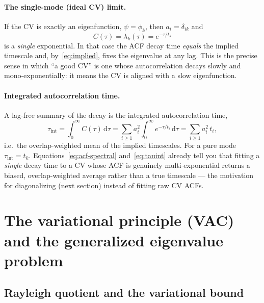 \documentclass[11pt]{article}
\theoremstyle{plain}
\theoremstyle{definition}
\newcommand{\dd}{\,\mathrm{d}}
\begin{document}
\paragraph{The single-mode (ideal CV) limit.}
If the CV is exactly an eigenfunction, $\psi=\phi_k$, then $a_i=\delta_{ik}$ and
\begin{equation}
C(\tau)=\lambda_k(\tau)=e^{-\tau/t_k}
\label{eq:acf-pure}
\end{equation}
is a \emph{single} exponential. In that case the ACF decay time \emph{equals} the
implied timescale and, by~\eqref{eq:implied}, fixes the eigenvalue at any lag. This
is the precise sense in which ``a good CV'' is one whose autocorrelation decays
slowly and mono-exponentially: it means the CV is aligned with a slow eigenfunction.

\paragraph{Integrated autocorrelation time.}
A lag-free summary of the decay is the integrated autocorrelation time,
\begin{equation}
\tau_{\mathrm{int}}=\int_0^\infty C(\tau)\dd\tau
=\sum_{i\ge1}a_i^2\!\int_0^\infty e^{-\tau/t_i}\dd\tau
=\sum_{i\ge1}a_i^2\,t_i ,
\label{eq:tauint}
\end{equation}
i.e.\ the overlap-weighted mean of the implied timescales. For a pure mode
$\tau_{\mathrm{int}}=t_k$. Equations~\eqref{eq:acf-spectral} and~\eqref{eq:tauint}
already tell you that fitting a \emph{single} decay time to a CV whose ACF is
genuinely multi-exponential returns a biased, overlap-weighted average rather than a
true timescale --- the motivation for diagonalizing (next section) instead of
fitting raw CV ACFs.

\section{The variational principle (VAC) and the generalized eigenvalue problem}
\label{sec:vac}

\subsection{Rayleigh quotient and the variational bound}
\end{document}
